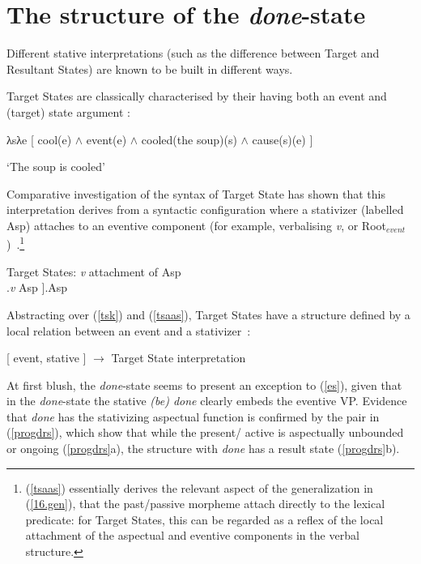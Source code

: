 \documentclass[output=paper,modfonts,nonflat]{langsci/langscibook}
\newcommand{\ro}[1]{$\sqrt{\mbox{\sc {#1}}}$}
\begin{document}
\section{The structure of the \emph{done}-state} \label{ssyn}

Different stative interpretations (such as the difference between Target and
Resultant States) are known to be built in different ways.

Target States are classically characterised by their having both an event and
(target) state argument \parencite{Kratzer2001a}:

\begin{exe}
\ex\label{tsk} λsλe [ cool(e) $\wedge$ event(e) $\wedge$ cooled(the soup)(s) $\wedge$ cause(s)(e) ]
\par `The soup is cooled' \hfill \parencite[391]{Kratzer2001a}
\end{exe}

Comparative investigation of the syntax of Target State  has shown
that this interpretation derives from a syntactic configuration where a
stativizer (labelled Asp) attaches to an eventive component (for example,
verbalising \emph{v}, or Root$_{event}$)~\citep{Alexiadou2008a, Embick2009a,
    Anagnostopoulou2013a, AlexiadouEtAl2015}.\footnote{(\ref{tsaas}) essentially
    derives the relevant aspect of the generalization in (\ref{16.gen}), that
    the past/passive morpheme attach directly to the lexical predicate: for
    Target States, this can be regarded as a reflex of the local attachment of
the aspectual and eventive components in the verbal structure.}


\begin{exe}
\ex\label{tsaas} Target States: \emph{v} attachment of Asp\\
\vspace{11pt}
\Tree  [  [  \ro{\dots}  {\dots} ].\emph{v}  Asp ].Asp
\end{exe}

Abstracting over (\ref{tsk}) and (\ref{tsaas}), Target States have a structure
defined by a local relation between an event and a
stativizer~\citep{Kratzer2001a, Alexiadou2008a, Embick2009a}:

\begin{exe}
\ex\label{es} {[ event, stative ]} $\rightarrow$ Target State interpretation
\end{exe}


At first blush, the \emph{done}-state seems to present an exception to
(\ref{es}), given that in the \emph{done}-state the stative \emph{(be) done}
clearly embeds the eventive VP\@. Evidence that \emph{done} has the stativizing
aspectual function is confirmed by the pair in (\ref{progdrs}), which show that
while the present/ active is aspectually unbounded or ongoing (\ref{progdrs}a),
the structure with \emph{done} has a result state (\ref{progdrs}b).
\end{document}

